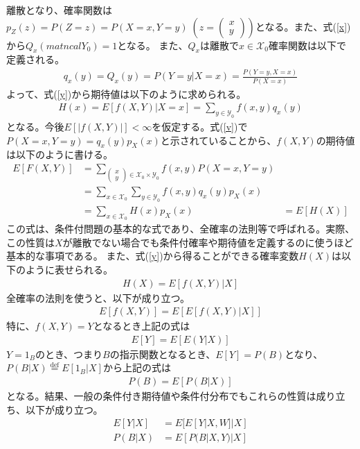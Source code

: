 \documentclass[a4j,12pt]{jarticle}
\begin{document}
離散となり、確率関数は$p_{Z}(z) = P(Z = z) = P(X = x,Y =y) \; (z = \left(\begin{array}{c}x \\ y\end{array} \right))$となる。また、式(\ref{x})から$Q_{x}(matncal{Y}_{0}) = 1$となる。
また、$Q_{x}$は離散で$x \in \mathcal{X}_{0}$確率関数は以下で定義される。
\begin{align}
\label{v}
q_{x}(y) = Q_{x}({y}) = P(Y = y|X=x) = \frac{P(Y = y,X = x)}{P(X=x)}
\end{align}
よって、式(\ref{y})から期待値は以下のように求められる。
\begin{align*}
H(x) = E[f(X,Y) | X = x] = \sum_{y \in \mathcal{Y}_{0}}f(x,y)q_{x}(y)
\end{align*}
となる。今後$E[|f(X,Y)|] < \infty$を仮定する。式(\ref{v})で$P(X = x,Y = y) = q_{x}(y)p_{X}(x)$と示されていることから、$f(X,Y)$の期待値は以下のように書ける。
\begin{align*}
E[F(X,Y)] &= \sum_{\left(\begin{array}{c}x \\ y \end{array}\right) \in \mathcal{X}_{0}×\mathcal{Y}_{0}} f(x,y)P(X = x,Y = y) \\
          &= \sum_{x\in \mathcal{X}_{0}}\sum_{y \in \mathcal{Y}_{0}}f(x,y)q_{x}(y)p_{X}(x) \\
          &= \sum_{x \in \mathcal{X}_{0}}H(x)p_{X}(x)
          &= E[H(X)]
\end{align*}
この式は、条件付問題の基本的な式であり、全確率の法則等で呼ばれる。実際、この性質は$X$が離散でない場合でも条件付確率や期待値を定義するのに使うほど基本的な事項である。
また、式(\ref{y})から得ることができる確率変数$H(X)$は以下のように表せられる。
\begin{align*}
H(X) = E[f(X,Y)|X]
\end{align*}
全確率の法則を使うと、以下が成り立つ。
\begin{align*}
E[f(X,Y)] = E[E[f(X,Y)|X]]
\end{align*}
特に、$f(X,Y) = Y$となるとき上記の式は
\begin{align*}
E[Y] = E[E(Y|X)]
\end{align*}
$Y = 1_{B}$のとき、つまり$B$の指示関数となるとき、$E[Y] = P(B)$となり、$P(B|X) \stackrel{\mathrm{def}}{=} E[1_{B}|X]$から上記の式は
\begin{align*}
P(B) = E[P(B|X)]
\end{align*}
となる。結果、一般の条件付き期待値や条件付分布でもこれらの性質は成り立ち、以下が成り立つ。
\begin{align}
E[Y|X] &= E[E[Y|X,W]|X] \\
P(B|X) &= E[P(B|X,Y)|X] \nonumber
\end{align}
\end{document}
